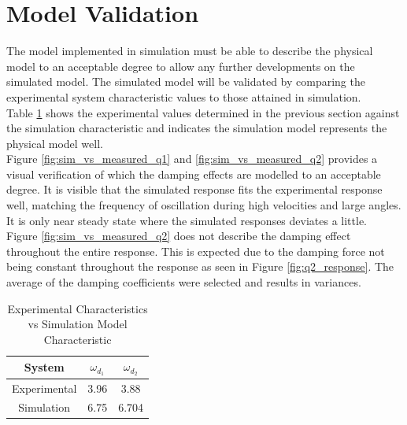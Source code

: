 \section{Model Validation}
The model implemented in simulation must be able to describe the physical model to an acceptable degree to allow any further developments on the simulated model. The simulated model will be validated by comparing the experimental system characteristic values to those attained in simulation.\\

Table \ref{table:experiment_vs_simulation} shows the experimental values determined in the previous section against the simulation characteristic and indicates the simulation model represents the physical model well.\\

Figure \ref{fig:sim_vs_measured_q1} and \ref{fig:sim_vs_measured_q2} provides a visual verification of which the damping effects are modelled to an acceptable degree. It is visible that the simulated response fits the experimental response well, matching the frequency of oscillation during high velocities and large angles. It is only near steady state where the simulated responses deviates a little. \\

Figure \ref{fig:sim_vs_measured_q2} does not describe the damping effect throughout the entire response. This is expected due to the damping force not being constant throughout the response as seen in Figure \ref{fig:q2_response}. The average of the damping coefficients were selected and results in variances.


\begin{table}[]
	\centering
	\begin{tabular}{|c|c|c|}
		\hline
		System & $\omega_{d_{1}}$  & $\omega_{d_{2}}$ \\
		\hline
		\hline
		Experimental  & 3.96 &  3.88\\
		\hline
		Simulation & 6.75 & 6.704\\ 
		\hline
	\end{tabular}
	\caption{Experimental Characteristics vs Simulation Model Characteristic}
	\label{table:experiment_vs_simulation}
\end{table}

